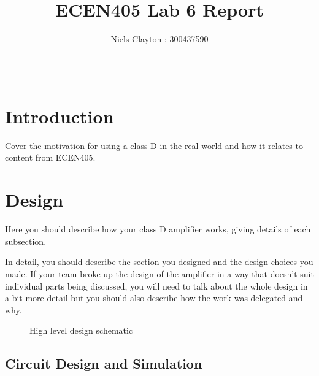 \documentclass[a4paper,11pt]{article}
\begin{document}
\title{\LARGE{\textbf{ECEN405 Lab 6 Report}}}
\author{Niels Clayton : 300437590}
\date{}
\maketitle
\hrule


\section{Introduction}

Cover the motivation for using a class D in the real world and how it relates to content from ECEN405.

\section{Design}

Here you should describe how your class D amplifier works, giving details of each subsection.

In detail, you should describe the section you designed and the design choices you made. If your team broke up the design of the amplifier in a way that doesn’t suit individual parts being discussed, you will need to talk about the whole design in a bit more detail but you should also describe how the work was delegated and why.

\begin{figure}[h!]
    \centering
    \caption{High level design schematic}
\end{figure}

\subsection{Circuit Design and Simulation}
\end{document}
